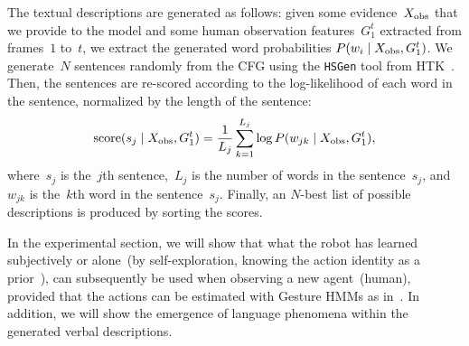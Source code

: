 The textual descriptions are generated as follows: given some evidence~$X_\text{obs}$ that we provide to the model and some human observation features~$G_1^t$ extracted from frames~$1$ to~$t$, we extract the generated word probabilities
$P(w_i \mid X_\text{obs}, G_1^t)$.
We generate~$N$ sentences randomly from the \ac{CFG} using the \texttt{HSGen} tool from HTK~\cite{young:htkbook}.
Then, the sentences are re-scored according to the log-likelihood of each word in the sentence, normalized by the length of the sentence:
\begin{equation} \label{eq:sentence_score}
  \text{score}(s_j \given \xobs, G_1^t) = \frac{1}{L_j} \sum_{k=1}^{L_j} \log P(w_{jk} \given \xobs, G_1^t),
\end{equation}
where~$s_j$ is the~$j$th sentence,~$L_j$ is the number of words in the sentence~$s_j$, and~$w_{jk}$ is the~$k$th word in the sentence~$s_j$.
Finally, an $N$-best list of possible descriptions is produced by sorting the scores.

%
%
%
%

\bigskip

In the experimental section, we will show that what the robot has learned subjectively or alone~(by self-exploration, knowing the action identity as a prior~\cite{salvi:2012:smcb}), can subsequently be used when observing a new agent~(human), provided that the actions can be estimated with Gesture \acp{HMM} as in~\cite{saponaro:2013:crhri}.
In addition, we will show the emergence of language phenomena within the generated verbal descriptions.
